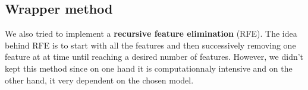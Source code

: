 \subsection{Wrapper method}

We also tried to implement a \textbf{recursive feature elimination} (RFE). The idea behind RFE is to start with all the features and then successively removing one feature at at time until reaching a desired number of features. However, we didn't kept this method since on one hand it is computationnaly intensive and on the other hand, it very dependent on the chosen model.

